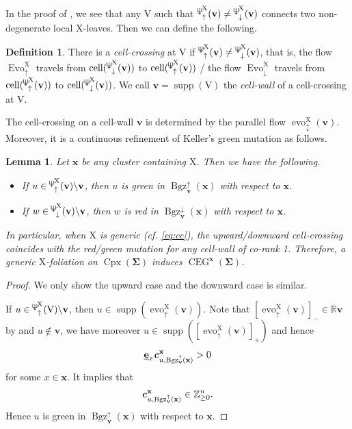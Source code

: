 \documentclass[11pt,reqno]{amsart}
\newcommand{\Neptune}{\mathord{\text{\tikz[baseline=-.5ex,scale=.13]{\draw[line width=.45pt] (0,0)--(0,1.8) (-.6,1.8)--(-.6,.8)--(.6,.8)--(.6,1.8) (-.35,.35)--(.35,.35);}}}}
\theoremstyle{plain}
\newtheorem{lemma}[theorem]{Lemma}
\theoremstyle{definition}
\newtheorem{definition}[theorem]{Definition}
\numberwithin{equation}{section}
\newcommand\ZZ{\mathbb{Z}}
\newcommand\RR{\mathbb{R}}
\newcommand\<{\langle}
\renewcommand\>{\rangle}
\newcommand{\CEG}{\operatorname{CEG}} %
\newcommand{\on}[1]{\operatorname{#1}}
\def\CCx{\on{Cpx}}   %
\def\cc{\on{cell}}  %
\def\vv{\mathbf{v}}
\def\sink{X}
\newcommand{\flowu}[1]{\on{evo}^{#1}_{\uparrow}}
\newcommand{\flowdu}[1]{\on{evo}_{\updownarrow}^{#1}}
\newcommand{\flowD}[1]{\on{Evo}_{\downarrow}^{#1}}
\newcommand{\flowU}[1]{\on{Evo}_{\uparrow}^{#1}}
\newcommand{\ccpt}[1]{\mathrm{#1}}%
\def\xevo{\ccpt{X}}%
\newcommand{\bfit}[1]{\textbf{\textit{#1}}}
\newcommand{\ubf}[1]{\underline{\mathbf{#1}}}
\def\seeds{\mathbf{\Sigma}}
\def\xx{\mathbf{x}}%
\def\cvec{\bfit{c}}
\def\supp{\on{supp}}
\newcommand{\Bgzp}[2]{\operatorname{Bgz}^{\uparrow}_{#2}(#1)}
\newcommand{\Bgzm}[2]{\operatorname{Bgz}^{\downarrow}_{#2}(#1)}
\newcommand{\suppd}[1]{\operatorname{\Neptune}_{\downarrow}^{#1}}
\newcommand{\suppu}[1]{\operatorname{\Neptune}_{\uparrow}^{#1}}
\def\ZZp{\ZZ_{\ge0}}
\begin{document}
In the proof of , we see that any $\ccpt{V}$ such that $\suppu{\xevo}(\vv)\ne\suppd{\xevo}(\vv)$ connects two non-degenerate local $\xevo$-leaves. Then we can define the following.

\begin{definition}\label{def:c-crossing}
    There is a \emph{cell-crossing} at $\ccpt{V}$ if $\suppu{\xevo}(\vv)\ne\suppd{\xevo}(\vv)$,
    that is, the flow $\flowU{\xevo}$ travels from $\cc(\suppd{\xevo}(\vv))$ to $\cc({\suppu{\xevo}(\vv)})$ / the flow $\flowD{\xevo}$ travels from $\cc(\suppu{\xevo}(\vv))$ to $\cc({\suppd{\xevo}(\vv)})$.
    We call $\vv=\supp(\ccpt{V})$ the \emph{cell-wall} of a cell-crossing at $\ccpt{V}$.
\end{definition}

The cell-crossing on a cell-wall $\vv$ is determined by the parallel flow $\flowdu{\xevo}(\vv)$.
Moreover, it is a continuous refinement of Keller's green mutation as follows.

\begin{lemma}\label{lem:gen-green}
Let ${\xx}$ be any cluster containing $\xevo$.
Then we have the following.
\begin{itemize}
    \item If $u\in\suppu{\xevo}(\vv)\backslash\vv$, then $u$ is green in $\Bgzp{{\xx}}{\vv}$ with respect to ${\xx}$.
    \item If $w\in\suppd{\xevo}(\vv)\backslash\vv$, then $w$ is red in $\Bgzm{{\xx}}{\vv}$ with respect to ${\xx}$.
\end{itemize}
In particular, when $\xevo$ is generic (cf. \eqref{eq:cc}), the upward/downward cell-crossing coincides with the red/green mutation for any cell-wall of co-rank 1.
Therefore, a generic $\xevo$-foliation on $\CCx(\seeds)$ induces $\CEG^\xx(\seeds)$.
\end{lemma}

\begin{proof}
We only show the upward case and the downward case is similar.

If $u\in\suppu{\xevo}(\ccpt{V})\backslash\vv$, then $u\in\supp(\flowu{\xevo}(\vv))$.
Note that $[\flowu{\xevo}(\vv)]_-\in\RR\vv$ by  and $u\not\in\vv$, we have moreover $u\in\supp([\flowu{\xevo}(\vv)]_+)$ and hence
\[
\ubf{e}_x\cvec^{{\xx}}_{u,\Bgzp{{\xx}}{\vv}}>0
\]
for some $x\in\xx$. It implies that
\[
\cvec^{{\xx}}_{u,\Bgzp{{\xx}}{\vv}}\in\ZZp^{n}.
\]
Hence $u$ is green in $\Bgzp{{\xx}}{\vv}$ with respect to ${\xx}$.
\end{proof}
\end{document}
